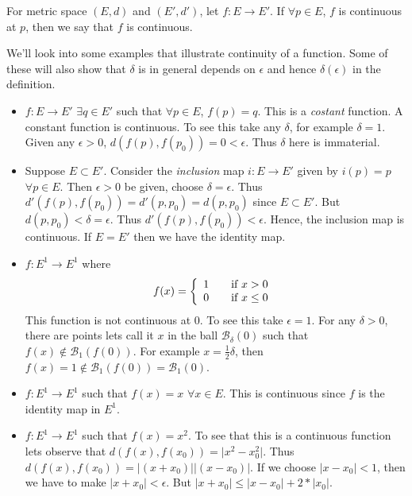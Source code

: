 \begin{Definition}[name=Continuous function]
    For metric space $(E,d)$ and $(E',d')$, let $f : E \to E'$. If $\forall p \in E$, $f$ is continuous
    at $p$, then we say that $f$ is continuous.
\end{Definition}

We'll look into some examples that illustrate continuity of a function. Some of these will also show
that $\delta$ is in general depends on $\epsilon$ and hence $\delta(\epsilon)$ in the definition.
\begin{itemize}
    \item $f : E \to E'$ $\exists q \in E'$ such that $\forall p \in E$, $f(p) = q$. This is a
	\emph{costant} function. A constant function is continuous. To see this take any $\delta$, for
	example $\delta = 1$. Given any $\epsilon > 0$, $d(f(p),f(p_0)) = 0 < \epsilon$. Thus $\delta$ here
	is immaterial.
    \item Suppose $E \subset E'$. Consider the \emph{inclusion} map $i : E \to E'$ given by $i(p) = p$
	$\forall p \in E$. Then $\epsilon > 0$ be given, choose $\delta = \epsilon$. Thus $d'(f(p), f(p_0))
	= d'(p,p_0) = d(p,p_0)$ since $E \subset E'$. But $d(p,p_0) < \delta = \epsilon$. Thus $
	d'(f(p), f(p_0)) < \epsilon$. Hence, the inclusion map is continuous. If $E = E'$ then we have the
	identity map.
    \item $f : E^1 \to E^1$ where 
	\[ f(x) = \left\{ 
	    \begin{array}{l l}
		1 & \quad \text{if $x > 0$ }\\
		0 & \quad \text{if $x \leq 0$ }
	\end{array} \right.\]
	This function is not continuous at $0$. To see this take $\epsilon = 1$. For any $\delta > 0$, there
	are points lets call it $x$ in the ball $\mathcal{B}_{\delta}(0)$ such that $f(x) \not \in
	\mathcal{B}_1(f(0))$. For example $x = \frac{1}{2}\delta$, then $f(x) = 1 \not \in 
	\mathcal{B}_1(f(0)) = \mathcal{B}_1(0) $.
    \item $f : E^1 \to E^1$ such that $f(x) = x$ $\forall x \in E$. This is continuous since $f$ is the
	identity map in $E^1$.
    \item $f : E^1 \to E^1$ such that $f(x) = x^2$. To see that this is a continuous function lets
	observe that $d(f(x),f(x_0)) = \lvert x^2 - x_0^2 \rvert$. Thus $d(f(x),f(x_0)) = \lvert (x+x_0)
	\rvert \lvert (x-x_0) \rvert$. If we choose $\lvert x - x_0 \rvert < 1$, then we have to make $\lvert
	x+x_0 \rvert < \epsilon$. But $\lvert x+x_0 \rvert \leq \lvert x-x_0 \rvert + 2*\lvert x_0 \rvert$.

\end{itemize}
